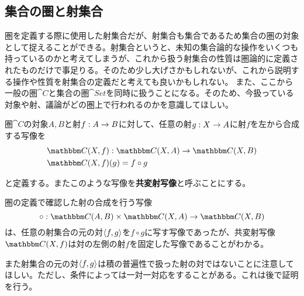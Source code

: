   \subsection{集合の圏と射集合}
	圏を定義する際に使用した射集合だが、射集合も集合であるため集合の圏の対象として捉えることができる。射集合というと、未知の集合論的な操作をいくつも持っているのかと考えてしまうが、これから扱う射集合の性質は圏論的に定義されたものだけで事足りる。そのため少し大げさかもしれないが、これから説明する操作や性質を射集合の定義だと考えても良いかもしれない。
  また、ここから一般の圏$\cat{C}$と集合の圏$\cat{Set}$を同時に扱うことになる。そのため、今扱っている対象や射、議論がどの圏上で行われるのかを意識してほしい。

  \begin{define}[共変射写像]
		圏$\cat{C}$の対象$A,B$と射$f:A\rightarrow B$に対して、任意の射$g:X\rightarrow A$に射$f$を左から合成する写像を
		\begin{align*}
			&\mor{\arset{C}{X}{f}}{\arset{C}{X}{A}}{\arset{C}{X}{B}}\\
			&\arset{C}{X}{f}(g)=f\circ g
		\end{align*}
		\begin{center}
		\end{center}
		と定義する。またこのような写像を\textbf{共変射写像}と呼ぶことにする。
	\end{define}
  
  圏の定義で確認した射の合成を行う写像\[\mor{\circ}{\arset{C}{A}{B}\times\arset{C}{X}{A}}{\arset{C}{X}{B}}\]
  は、任意の射集合の元の対$\langle f,g\rangle$を$f\circ g$に写す写像であったが、共変射写像$\arset{C}{X}{f}$は対の左側の射$f$を固定した写像であることがわかる。

  また射集合の元の対$\langle f,g\rangle$は積の普遍性で扱った射の対ではないことに注意してほしい。ただし、条件によっては一対一対応をすることがある。これは後で証明を行う。

